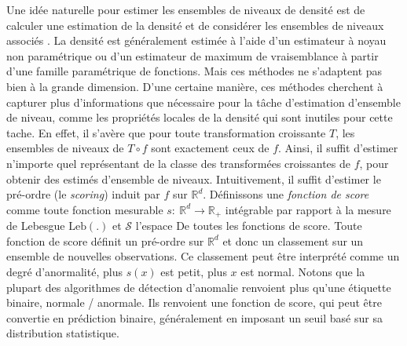 \documentclass[a4paper, 12pt]{article}
\def\rset{\mathbb{R}}
\def\S{\mathcal{S}}
\def\leb{\text{Leb}}
\begin{document}

Une idée naturelle pour estimer les ensembles de niveaux de densité est de calculer une estimation de la densité et de considérer les ensembles de niveaux associés \citep{Tsybakov1997, Cuevas1997, Baillo2001, Baillo2003, Cadre2006, Rigollet2009, Mason2009}.
La densité est généralement estimée à l'aide d'un estimateur à noyau non paramétrique ou d'un estimateur de maximum de vraisemblance à partir d'une famille paramétrique de fonctions. Mais ces méthodes ne s'adaptent pas bien à la  grande dimension. D'une certaine manière, ces méthodes cherchent à capturer plus d'informations que nécessaire pour la tâche d'estimation d'ensemble de niveau, comme les propriétés locales de la densité qui sont inutiles pour cette tache. En effet, il s'avère que pour toute transformation croissante $ T $, les ensembles de niveaux de $ T \circ f $ sont exactement ceux de $ f $. Ainsi, il suffit d'estimer n'importe quel représentant de la classe des transformées croissantes de $ f $, pour obtenir des estimés d'ensemble de niveaux. Intuitivement, il suffit d'estimer le pré-ordre (le \emph {scoring}) induit par $ f $ sur $ \rset ^ d $. Définissons une \emph {fonction de score} comme toute fonction mesurable $ s: ~ \rset ^ d \to \rset _ + $ intégrable par rapport à la mesure de Lebesgue $ \leb (.) $ et $ \S $ l'espace De toutes les fonctions de score.
Toute fonction de score définit un pré-ordre sur $ \rset ^ d $ et donc un classement sur un ensemble de nouvelles observations. Ce classement peut être interprété comme un degré d'anormalité, plus $ s (x) $ est petit, plus $ x $ est normal. Notons que la plupart des algorithmes de détection d'anomalie renvoient plus qu'une étiquette binaire, normale / anormale. Ils renvoient une fonction de score, qui peut être convertie en prédiction binaire, généralement en imposant un seuil basé sur sa distribution statistique.
\end{document}
